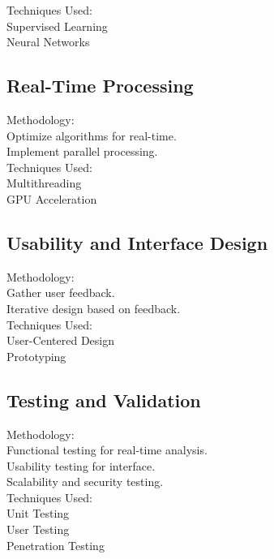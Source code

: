 \documentclass[12pt]{article}
\begin{document}
Techniques Used:\\[0.3mm]
Supervised Learning\\[0.3mm]
Neural Networks\\[0.3mm]

\subsection{Real-Time Processing}
Methodology:\\[0.3mm]
Optimize algorithms for real-time.\\[0.3mm]
Implement parallel processing.\\[0.3mm]

Techniques Used:\\[0.3mm]
Multithreading\\[0.3mm]
GPU Acceleration\\[0.3mm]

\subsection{ Usability and Interface Design}
Methodology:\\[0.3mm]
Gather user feedback.\\[0.3mm]
Iterative design based on feedback.\\[0.3mm]

Techniques Used:\\[0.3mm]
User-Centered Design\\[0.3mm]
Prototyping\\[0.3mm]

\subsection{Testing and Validation}
Methodology:\\[0.3mm]
Functional testing for real-time analysis.\\[0.3mm]
Usability testing for interface.\\[0.3mm]
Scalability and security testing.\\[0.3mm]

Techniques Used:\\[0.3mm]
Unit Testing\\[0.3mm]
User Testing\\[0.3mm]
Penetration Testing\\[0.3mm]
 
 
\end{document}
